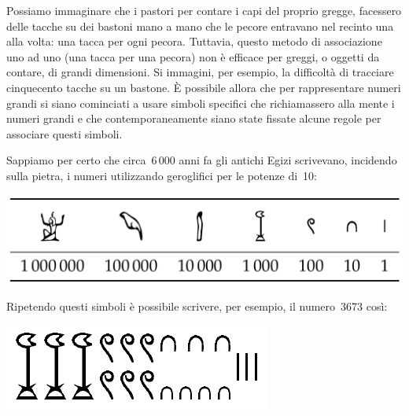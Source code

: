 Possiamo immaginare che i pastori per contare i capi del proprio gregge, 
facessero delle tacche su dei bastoni mano a mano che le pecore entravano nel 
recinto una alla volta: una tacca per ogni pecora. 
Tuttavia, questo metodo di associazione uno ad uno (una tacca per una pecora) 
non è efficace per greggi, o oggetti da contare, di grandi dimensioni. 
Si immagini, per esempio, la difficoltà di tracciare cinquecento tacche su un 
bastone. 
È possibile allora che per rappresentare numeri grandi si siano cominciati a 
usare simboli specifici che richiamassero alla mente i numeri grandi e che 
contemporaneamente siano state fissate alcune regole per associare questi 
simboli.

Sappiamo per certo che circa~6\,000 anni fa gli antichi Egizi scrivevano, 
incidendo sulla pietra, i numeri utilizzando geroglifici per le potenze di~10:

% 
\begin{inaccessibleblock}
\vspace{-2ex}
\begin{center} \includegraphics[scale=0.28]{img/hieropotdieci.png} \end{center}
\vspace{-2ex}
\end{inaccessibleblock}
                                                                  
Ripetendo questi simboli è possibile scrivere, per esempio, il numero~3673 
così:

\begin{inaccessibleblock}
\vspace{-2ex}
\begin{center} \includegraphics[scale=0.25]{img/hiero3673.png} \end{center}
\vspace{-2ex}
\end{inaccessibleblock}

